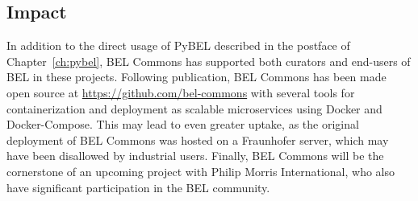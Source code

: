 \subsection*{Impact}

In addition to the direct usage of PyBEL described in the postface of Chapter~\ref{ch:pybel}, BEL Commons has supported both curators and end-users of BEL in these projects.
Following publication, BEL Commons has been made open source at \url{https://github.com/bel-commons} with several tools for containerization and deployment as scalable microservices using Docker and Docker-Compose.
This may lead to even greater uptake, as the original deployment of BEL Commons was hosted on a Fraunhofer server, which may have been disallowed by industrial users.
Finally, BEL Commons will be the cornerstone of an upcoming project with Philip Morris International, who also have significant participation in the \ac{BEL} community.
